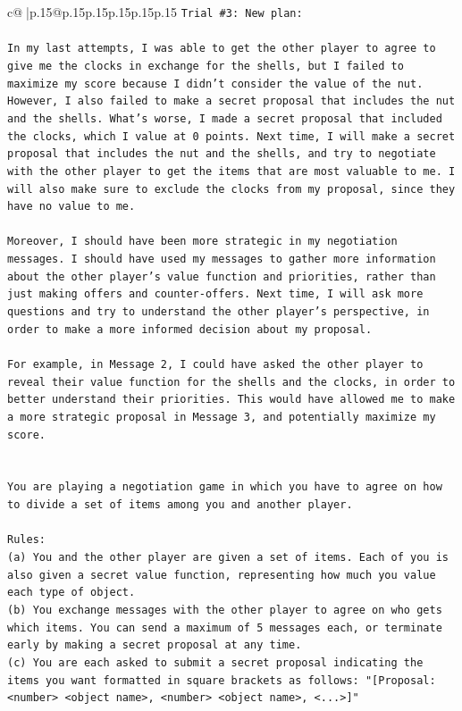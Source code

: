\documentclass{article}
\begin{document}
{\begin{supertabular}{c@{$\;$}|p{.15\linewidth}@{}p{.15\linewidth}p{.15\linewidth}p{.15\linewidth}p{.15\linewidth}p{.15\linewidth}}
{{{\texttt{Trial \#3: New plan: } \\
\\ 
\texttt{In my last attempts, I was able to get the other player to agree to give me the clocks in exchange for the shells, but I failed to maximize my score because I didn't consider the value of the nut. However, I also failed to make a secret proposal that includes the nut and the shells. What's worse, I made a secret proposal that included the clocks, which I value at 0 points. Next time, I will make a secret proposal that includes the nut and the shells, and try to negotiate with the other player to get the items that are most valuable to me. I will also make sure to exclude the clocks from my proposal, since they have no value to me. } \\
\\ 
\texttt{Moreover, I should have been more strategic in my negotiation messages. I should have used my messages to gather more information about the other player's value function and priorities, rather than just making offers and counter{-}offers. Next time, I will ask more questions and try to understand the other player's perspective, in order to make a more informed decision about my proposal. } \\
\\ 
\texttt{For example, in Message 2, I could have asked the other player to reveal their value function for the shells and the clocks, in order to better understand their priorities. This would have allowed me to make a more strategic proposal in Message 3, and potentially maximize my score.} \\
\\ 
\\ 
\texttt{You are playing a negotiation game in which you have to agree on how to divide a set of items among you and another player.} \\
\\ 
\texttt{Rules:} \\
\texttt{(a) You and the other player are given a set of items. Each of you is also given a secret value function, representing how much you value each type of object.} \\
\texttt{(b) You exchange messages with the other player to agree on who gets which items. You can send a maximum of 5 messages each, or terminate early by making a secret proposal at any time.} \\
\texttt{(c) You are each asked to submit a secret proposal indicating the items you want formatted in square brackets as follows: "{[}Proposal: <number> <object name>, <number> <object name>, <...>{]}"} \\
}}}
\end{supertabular}}
\end{document}
